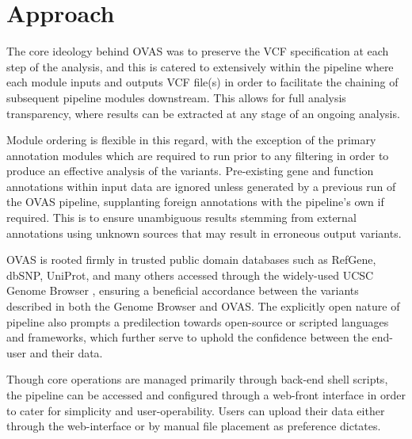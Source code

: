 \documentclass{bioinfo}
\def\app{OVAS}
\begin{document}
\vspace{-1cm}
\section{Approach}

The core ideology behind \app{} was to preserve the VCF specification at each step of the analysis, and this is catered to extensively within the pipeline where each module inputs and outputs VCF file(s) in order to facilitate the chaining of subsequent pipeline modules downstream. This allows for full analysis transparency, where results can be extracted at any stage of an ongoing analysis. 

Module ordering is flexible in this regard, with the exception of the primary annotation modules which are required to run prior to any filtering in order to produce an effective analysis of the variants. Pre-existing gene and function annotations within input data are ignored unless generated by a previous run of the \app{} pipeline, supplanting foreign annotations with the pipeline's own if required. This is to ensure unambiguous results stemming from external annotations using unknown sources that may result in erroneous output variants.

\app{} is rooted firmly in trusted public domain databases such as RefGene, dbSNP, UniProt, and many others accessed through the widely-used UCSC Genome Browser \citep{karolchik2003ucsc}, ensuring a beneficial accordance between the variants described in both the Genome Browser and \app{}. The explicitly open nature of pipeline also prompts a predilection towards open-source or scripted languages and frameworks, which further serve to uphold the confidence between the end-user and their data.

Though core operations are managed primarily through back-end shell scripts, the pipeline can be accessed and configured through a web-front interface in order to cater for simplicity and user-operability. Users can upload their data either through the web-interface or by manual file placement as preference dictates.
\end{document}
